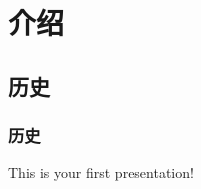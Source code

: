 \documentclass{beamer}
\begin{document}
{\begin{frame}
    \end{frame}

\section{介绍}
    \subsection{历史}
    \begin{frame} \frametitle{历史}
        This is your first presentation!
    \end{frame}



} %
\end{document}
